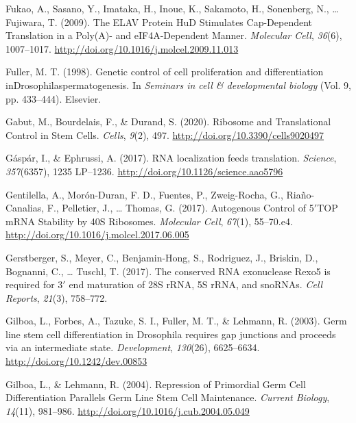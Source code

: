 \documentclass[12pt,twoside]{reedthesis}
\newlength{\cslhangindent}
\newenvironment{cslreferences}%
  {\setlength{\parindent}{0pt}%
  \everypar{\setlength{\hangindent}{\cslhangindent}}\ignorespaces}%
  {\par}
\begin{document}
\begin{cslreferences}
\leavevmode\hypertarget{ref-Fukao2009c}{}%
Fukao, A., Sasano, Y., Imataka, H., Inoue, K., Sakamoto, H., Sonenberg, N., \ldots{} Fujiwara, T. (2009). The ELAV Protein HuD Stimulates Cap-Dependent Translation in a Poly(A)- and eIF4A-Dependent Manner. \emph{Molecular Cell}, \emph{36}(6), 1007--1017. \url{http://doi.org/10.1016/j.molcel.2009.11.013}

\leavevmode\hypertarget{ref-Fuller1998c}{}%
Fuller, M. T. (1998). Genetic control of cell proliferation and differentiation inDrosophilaspermatogenesis. In \emph{Seminars in cell \& developmental biology} (Vol. 9, pp. 433--444). Elsevier.

\leavevmode\hypertarget{ref-gabutRibosomeTranslationalControl2020}{}%
Gabut, M., Bourdelais, F., \& Durand, S. (2020). Ribosome and Translational Control in Stem Cells. \emph{Cells}, \emph{9}(2), 497. \url{http://doi.org/10.3390/cells9020497}

\leavevmode\hypertarget{ref-Gaspar2017b}{}%
Gáspár, I., \& Ephrussi, A. (2017). RNA localization feeds translation. \emph{Science}, \emph{357}(6357), 1235 LP--1236. \url{http://doi.org/10.1126/science.aao5796}

\leavevmode\hypertarget{ref-gentilellaAutogenousControlTOP2017}{}%
Gentilella, A., Morón-Duran, F. D., Fuentes, P., Zweig-Rocha, G., Riaño-Canalias, F., Pelletier, J., \ldots{} Thomas, G. (2017). Autogenous Control of 5\({'}\)TOP mRNA Stability by 40S Ribosomes. \emph{Molecular Cell}, \emph{67}(1), 55--70.e4. \url{http://doi.org/10.1016/j.molcel.2017.06.005}

\leavevmode\hypertarget{ref-Gerstberger2017}{}%
Gerstberger, S., Meyer, C., Benjamin-Hong, S., Rodriguez, J., Briskin, D., Bognanni, C., \ldots{} Tuschl, T. (2017). The conserved RNA exonuclease Rexo5 is required for 3\({'}\) end maturation of 28S rRNA, 5S rRNA, and snoRNAs. \emph{Cell Reports}, \emph{21}(3), 758--772.

\leavevmode\hypertarget{ref-gilboaGermLineStem2003}{}%
Gilboa, L., Forbes, A., Tazuke, S. I., Fuller, M. T., \& Lehmann, R. (2003). Germ line stem cell differentiation in Drosophila requires gap junctions and proceeds via an intermediate state. \emph{Development}, \emph{130}(26), 6625--6634. \url{http://doi.org/10.1242/dev.00853}

\leavevmode\hypertarget{ref-Gilboa2004a}{}%
Gilboa, L., \& Lehmann, R. (2004). Repression of Primordial Germ Cell Differentiation Parallels Germ Line Stem Cell Maintenance. \emph{Current Biology}, \emph{14}(11), 981--986. \url{http://doi.org/10.1016/j.cub.2004.05.049}


\end{cslreferences}
\end{document}
